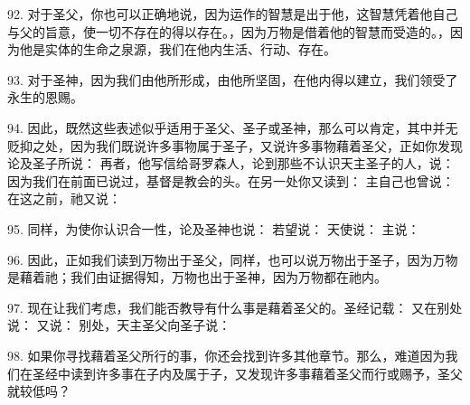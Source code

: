 92. 对于圣父，你也可以正确地说，因为运作的智慧是出于他，这智慧凭着他自己与父的旨意，使一切不存在的得以存在。，因为万物是借着他的智慧而受造的。，因为他是实体的生命之泉源，我们在他内生活、行动、存在。\par

93. 对于圣神，因为我们由他所形成，由他所坚固，在他内得以建立，我们领受了永生的恩赐。\par

94. 因此，既然这些表述似乎适用于圣父、圣子或圣神，那么可以肯定，其中并无贬抑之处，因为我们既说许多事物属于圣子，又说许多事物藉着圣父，正如你发现论及圣子所说：  再者，他写信给哥罗森人，论到那些不认识天主圣子的人，说：  因为我们在前面已说过，基督是教会的头。在另一处你又读到： 主自己也曾说：  在这之前，祂又说： \par

95. 同样，为使你认识合一性，论及圣神也说：  若望说：  天使说：  主说： \par

96. 因此，正如我们读到万物出于圣父，同样，也可以说万物出于圣子，因为万物是藉着祂；我们由证据得知，万物也出于圣神，因为万物都在祂内。\par

97. 现在让我们考虑，我们能否教导有什么事是藉着圣父的。圣经记载：  又在别处说：  又说：  别处，天主圣父向圣子说：\par

98. 如果你寻找藉着圣父所行的事，你还会找到许多其他章节。那么，难道因为我们在圣经中读到许多事在子内及属于子，又发现许多事藉着圣父而行或赐予，圣父就较低吗？\par

